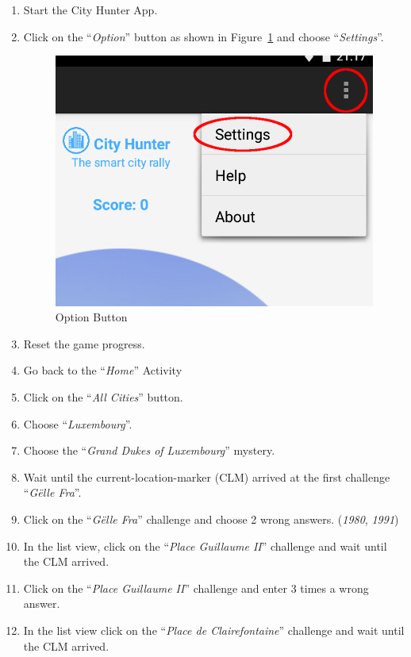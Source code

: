 \begin{enumerate}
	\item Start the City Hunter App.
	\item Click on the ``\emph{Option}'' button as shown in Figure~\ref{fig:optionButton} and choose ``\emph{Settings}''.
		\begin{figure}[H]
			\centering
			\includegraphics[scale=0.3]{Figures/SettingsButton}
			\caption{Option Button}
			\label{fig:optionButton}
		\end{figure}
	\item Reset the game progress.
	\item Go back to the ``\emph{Home}'' Activity
	\item Click on the ``\emph{All Cities}'' button.
	\item Choose ``\emph{Luxembourg}''.
	\item Choose the ``\emph{Grand Dukes of Luxembourg}'' mystery.
	\item Wait until the current-location-marker (CLM) arrived at the first challenge ``\emph{G\"elle Fra}''.
	\item Click on the ``\emph{G\"elle Fra}'' challenge and choose 2 wrong answers. (\emph{1980}, \emph{1991}) 
	\item In the list view, click on the ``\emph{Place Guillaume II}'' challenge and wait until the CLM arrived.
	\item Click on the ``\emph{Place Guillaume II}'' challenge and enter 3 times a wrong answer.
	\item In the list view click on the ``\emph{Place de Clairefontaine}'' challenge and wait until the CLM arrived.

\end{enumerate}
